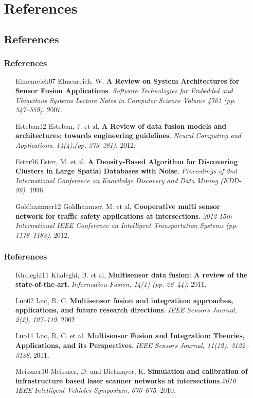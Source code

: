 \documentclass[table]{beamer}
\begin{document}
\section{References}
\subsection{References}
\frame
{
	\frametitle{References}
	\footnotesize{	
	\begin{itemize}[leftmargin=.6in]
		\item [Elmenreich07] Elmenreich, W. \textbf{A Review on System Architectures for Sensor Fusion Applications}. \textit{Software Technologies for Embedded and Ubiquitous Systems
Lecture Notes in Computer Science Volume 4761 (pp. 547–559)}. 2007.
		\item [Esteban12] Esteban, J. et al, \textbf{A Review of data fusion models and architectures: towards 	engineering guidelines}. \textit{Neural Computing and Applications, 14(4),(pp. 273–281)}. 2012.
		\item [Ester96] Ester, M. et al. \textbf{A Density-Based Algorithm for Discovering Clusters in Large Spatial Databases with Noise}. \textit{Proceedings of 2nd International Conference on Knowledge Discovery and Data Mining (KDD-96)}. 1996.
		\item [Goldhammer12] Goldhammer, M. et al, \textbf{Cooperative multi sensor network for traffic safety applications at intersections}. \textit{2012 15th International IEEE Conference on Intelligent Transportation Systems (pp. 1178–1183)}. 2012.		
	\end{itemize}
	}
}

\frame
{
	\frametitle{References}
	\footnotesize{	
	\begin{itemize}[leftmargin=.6in]
		\item [Khaleghi11] Khaleghi, B. et al, \textbf{Multisensor data fusion: A review of the state-of-the-art}. \textit{Information Fusion, 14(1) (pp. 28–44)}. 2011.
		\item [Luo02] Luo, R. C. \textbf{Multisensor fusion and integration: approaches, applications, and future research directions}. \textit{IEEE Sensors Journal, 2(2), 107–119}. 2002
		\item [Luo11] Luo, R. C. et al. \textbf{Multisensor Fusion and Integration: Theories, Applications, and its Perspectives}. \textit{IEEE Sensors Journal, 11(12), 3122–3138}. 2011.
	    \item [Meissner10] Meissner, D. and Dietmayer, K. \textbf{Simulation and calibration of infrastructure based laser scanner networks at intersections}.\textit{2010 IEEE Intelligent Vehicles Symposium, 670–675}. 2010.	    
	\end{itemize}
	}
}
\end{document}
